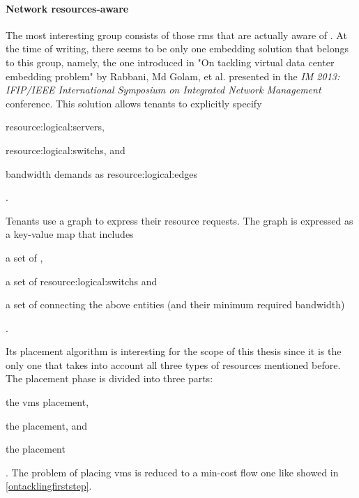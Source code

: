 \paragraph{Network resources-aware} \label{network_resources-aware_rms}
The most interesting group consists of those \glspl{rm} that are actually aware of .
At the time of writing, there seems to be only one embedding solution that belongs to this group, namely, the one introduced in "On tackling virtual data center embedding problem" \cite{ontackling} by Rabbani, Md Golam, et al. presented in the \textit{IM 2013: IFIP/IEEE International Symposium on Integrated Network Management} conference.
This solution allows tenants to explicitly specify
\begin{mylist}
    \item \glspl{resource:logical:server},
    \item \glspl{resource:logical:switch}, and
    \item bandwidth demands as \glspl{resource:logical:edge}
\end{mylist}.

Tenants use a graph to express their resource requests.
The graph is expressed as a key-value map that includes
\begin{mylist}
    \item a set of ,
    \item a set of \glspl{resource:logical:switch} and
    \item a set of  connecting the above entities (and their minimum required bandwidth)
\end{mylist}.

Its placement algorithm is interesting for the scope of this thesis since it is the only one that takes into account all three types of resources mentioned before.
The placement phase is divided into three parts:
\begin{mylist}
    \item the \glspl{vm} placement,
    \item the  placement, and
    \item the  placement
\end{mylist}.
The problem of placing \glspl{vm} is reduced to a min-cost flow one like showed in \autoref{ontacklingfirststep}.

